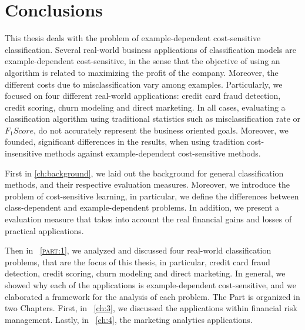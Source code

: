 \chapter{Conclusions}\label{ch:10}

This thesis deals with the problem of example-dependent cost-sensitive classification.
Several real-world business applications of classification models are example-dependent 
cost-sensitive, in the sense that the objective of using an algorithm is related to maximizing the 
profit of the company. Moreover, the different costs due to misclassification vary among examples. 
Particularly, we focused on four different real-world applications: credit card fraud 
detection, credit scoring, churn modeling and direct marketing. In all cases, evaluating a 
classification algorithm using traditional statistics such as misclassification rate or $F_1Score$, 
do not accurately represent the business oriented goals. Moreover, we founded, significant 
differences in the results, when using tradition cost-insensitive methods against example-dependent 
cost-sensitive methods.


First in \chaptername{ \ref{ch:background}}, we laid out the background for general classification 
methods, and their respective evaluation measures. Moreover, we introduce the problem of 
cost-sensitive learning, in particular, we define the differences between class-dependent and 
example-dependent problems. In addition, we present a evaluation measure that takes into account 
the real financial gains and losses of practical applications.

Then in \partname{~\textsc{\ref{part:1}}}, we analyzed and discussed four real-world 
classification problems, that are the focus of this thesis, in particular, credit card fraud 
detection, credit scoring, churn modeling and direct marketing. In general, we showed why each of 
the applications is example-dependent cost-sensitive, and we elaborated a framework for the 
analysis of each problem. The Part is organized in two Chapters. First, in 
\chaptername{~\ref{ch:3}}, we discussed the applications within financial risk management. Lastly, 
in \chaptername{~\ref{ch:4}}, the marketing analytics applications.

